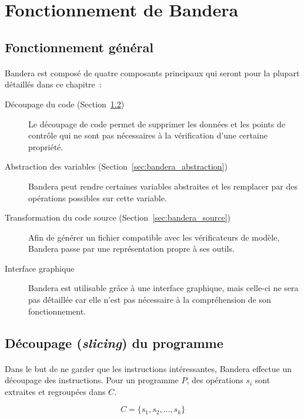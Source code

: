 \section{Fonctionnement de Bandera}
\subsection{Fonctionnement général}

\paragraph{}
Bandera est composé de quatre composants principaux qui seront pour la
plupart détaillés dans ce chapitre~:

\begin{description}
\item[Découpage du code (Section~\ref{sec:bandera_slicing})] Le découpage de code permet de supprimer les
  données et les points de contrôle qui ne sont pas nécessaires à la
  vérification d'une certaine propriété.
\item[Abstraction des variables (Section~\ref{sec:bandera_abstraction})] Bandera peut rendre certaines
  variables abstraites et les remplacer par des opérations possibles
  sur cette variable.
\item[Transformation du code source (Section~\ref{sec:bandera_source})] Afin de générer un fichier
  compatible avec les vérificateurs de modèle, Bandera passe par une
  représentation propre à ses outils.
\item[Interface graphique] Bandera est utilisable grâce à une
  interface graphique, mais celle-ci ne sera pas détaillée car elle
  n'est pas nécessaire à la compréhension de son fonctionnement.
\end{description}

\subsection{Découpage (\textit{slicing}) du programme}
\label{sec:bandera_slicing}

\paragraph{}
Dans le but de ne garder que les instructions intéressantes, Bandera
effectue un découpage des instructions. Pour un programme $P$, des
opérations $s_i$ sont extraites et regroupées dans $C$.

$$C = \{s_1, s_2, \ldots, s_k\}$$

